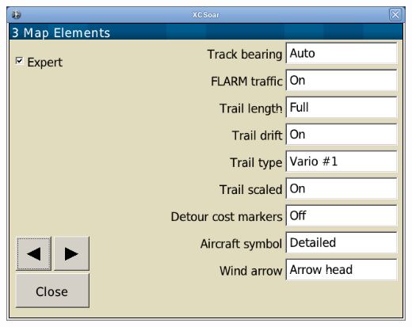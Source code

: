 \begin{center}
\includegraphics[angle=0,width=0.8\linewidth,keepaspectratio='true']{figures/config-map_elements.png}
\end{center}

